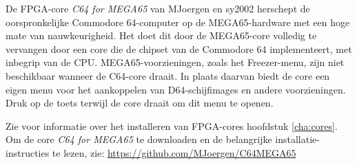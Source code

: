 De FPGA-core {\it C64 for MEGA65} van MJoergen en sy2002 herschept de oorspronkelijke Commodore 64-computer op de MEGA65-hardware met een hoge mate van nauwkeurigheid. Het doet dit door de MEGA65-core volledig te vervangen door een core die de chipset van de Commodore 64 implementeert, met inbegrip van de CPU. MEGA65-voorzieningen, zoals het Freezer-menu, zijn niet beschikbaar wanneer de C64-core draait. In plaats daarvan biedt de core een eigen menu voor het aankoppelen van D64-schijfimages en andere voorzieningen. Druk op de toets  terwijl de core draait om dit menu te openen.


Zie voor informatie over het installeren van FPGA-cores hoofdstuk \vref{cha:cores}. Om de core {\it C64 for MEGA65} te downloaden en de belangrijke installatie-instructies te lezen, zie: \url{https://github.com/MJoergen/C64MEGA65}
